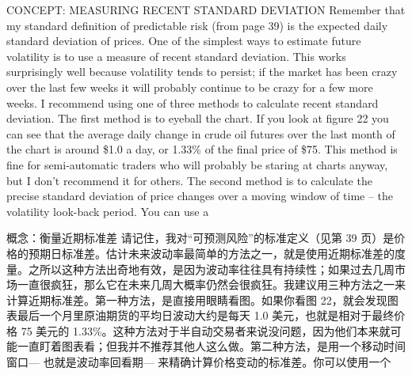 \begin{englishblock} CONCEPT: MEASURING RECENT STANDARD DEVIATION Remember that my standard definition of predictable risk (from page 39) is the expected daily standard deviation of prices. One of the simplest ways to estimate future volatility is to use a measure of recent standard deviation. This works surprisingly well because volatility tends to persist; if the market has been crazy over the last few weeks it will probably continue to be crazy for a few more weeks. I recommend using one of three methods to calculate recent standard deviation. The first method is to eyeball the chart. If you look at figure 22 you can see that the average daily change in crude oil futures over the last month of the chart is around \$1.0 a day, or 1.33\% of the final price of \$75. This method is fine for semi-automatic traders who will probably be staring at charts anyway, but I don't recommend it for others. The second method is to calculate the precise standard deviation of price changes over a moving window of time -- the volatility look-back period. You can use a \end{englishblock}

\begin{chineseblock}概念：衡量近期标准差 请记住，我对“可预测风险”的标准定义（见第 39 页）是价格的预期日标准差。估计未来波动率最简单的方法之一，就是使用近期标准差的度量。之所以这种方法出奇地有效，是因为波动率往往具有持续性；如果过去几周市场一直很疯狂，那么它在未来几周大概率仍然会很疯狂。我建议用三种方法之一来计算近期标准差。第一种方法，是直接用眼睛看图。如果你看图 22，就会发现图表最后一个月里原油期货的平均日波动大约是每天 1.0 美元，也就是相对于最终价格 75 美元的 1.33\%。这种方法对于半自动交易者来说没问题，因为他们本来就可能一直盯着图表看；但我并不推荐其他人这么做。第二种方法，是用一个移动时间窗口--- 也就是波动率回看期--- 来精确计算价格变动的标准差。你可以使用一个\end{chineseblock}

\bipairgap

